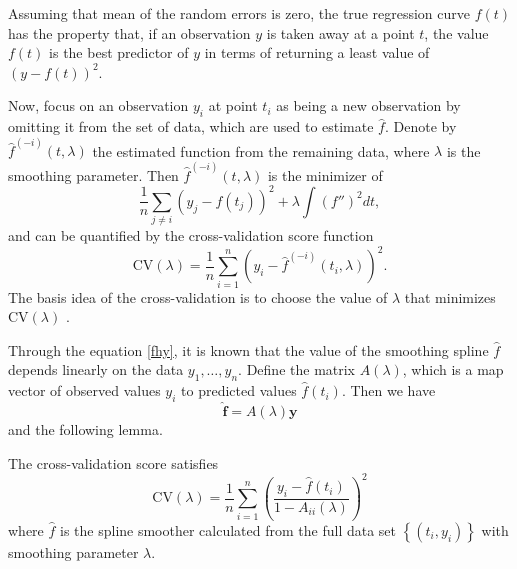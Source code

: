 Assuming that mean of the random errors is zero, the true regression curve $f(t)$ has the property that, if an observation $y$ is taken away at a point $t$, the value $f(t)$ is the best predictor of $y$ in terms of returning a least value of $\left(y-f(t)\right)^2$. 

Now, focus on an observation $y_i$ at point $t_i$ as being a new observation by omitting it from the set of data, which are used to estimate $\hat{f}$. Denote by $\hat{f}^{(-i)}(t,\lambda)$ the estimated function from the remaining data, where $\lambda$ is the smoothing parameter. Then $\hat{f}^{(-i)}\left(t,\lambda\right)$ is the minimizer of  
\begin{equation}\label{originalcv}
\frac{1}{n}\sum_{j \neq i}\left(y_j-f(t_j) \right)^2+\lambda\int (f'')^2dt,
\end{equation}
and can be quantified by the cross-validation score function
\begin{equation}\label{cvform}
\mbox{CV}(\lambda)=\frac{1}{n}\sum_{i=1}^{n}\left(  y_i-\hat{f}^{(-i)}(t_i,\lambda)\right) ^2.
\end{equation}
The basis idea of the cross-validation is to choose the value of $\lambda$ that minimizes $\mbox{CV}(\lambda)$ \citep{green1993nonparametric}. 

Through the equation \eqref{fhy}, it is known that the value of the smoothing spline $\hat{f}$ depends linearly on the data $y_1,\ldots,y_n$. Define the matrix $A(\lambda)$, which is a map vector of observed values $y_i$ to predicted values $\hat{f}(t_i)$. Then we have
\begin{equation}\label{crossvalidationmatrixA}
\hat{\mathbf{f}}=A(\lambda)\mathbf{y}
\end{equation}
and the following lemma.
\begin{lemma}\citep{green1993nonparametric}\label{cvlema}
The cross-validation score satisfies
\begin{equation}
\mbox{CV}(\lambda)=\frac{1}{n} \sum_{i=1}^n \left(\frac{y_i-\hat{f}(t_i)}{1-A_{ii}(\lambda)}\right)^2
\end{equation}
where $\hat{f}$ is the spline smoother calculated from the full data set $\left\lbrace (t_i,y_i)\right\rbrace$ with smoothing parameter $\lambda$.
\end{lemma}

